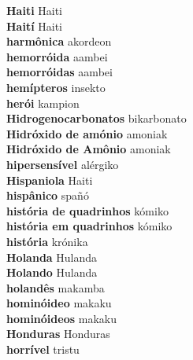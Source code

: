 \textbf{ Haiti  } Haiti \\
\textbf{ Haití  } Haiti \\
\textbf{ harmônica  } akordeon \\
\textbf{ hemorróida  } aambei \\
\textbf{ hemorróidas  } aambei \\
\textbf{ hemípteros  } insekto \\
\textbf{ herói  } kampion \\
\textbf{ Hidrogenocarbonatos  } bikarbonato \\
\textbf{ Hidróxido de amónio  } amoniak \\
\textbf{ Hidróxido de Amônio  } amoniak \\
\textbf{ hipersensível  } alérgiko \\
\textbf{ Hispaniola  } Haiti \\
\textbf{ hispânico  } spañó \\
\textbf{ história de quadrinhos  } kómiko \\
\textbf{ história em quadrinhos  } kómiko \\
\textbf{ história  } krónika \\
\textbf{ Holanda  } Hulanda \\
\textbf{ Holando  } Hulanda \\
\textbf{ holandês  } makamba \\
\textbf{ hominóideo  } makaku \\
\textbf{ hominóideos  } makaku \\
\textbf{ Honduras  } Honduras \\
\textbf{ horrível  } tristu \\

